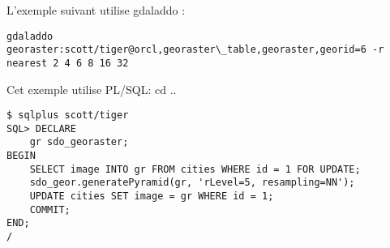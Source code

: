 L'exemple suivant utilise gdaladdo :
\begin{verbatim}
gdaladdo georaster:scott/tiger@orcl,georaster\_table,georaster,georid=6 -r 
nearest 2 4 6 8 16 32
\end{verbatim}

Cet exemple utilise PL/SQL: 
cd ..
\begin{verbatim}
$ sqlplus scott/tiger
SQL> DECLARE
    gr sdo_georaster;
BEGIN
    SELECT image INTO gr FROM cities WHERE id = 1 FOR UPDATE;
    sdo_geor.generatePyramid(gr, 'rLevel=5, resampling=NN');
    UPDATE cities SET image = gr WHERE id = 1;
    COMMIT;
END;
/
\end{verbatim}